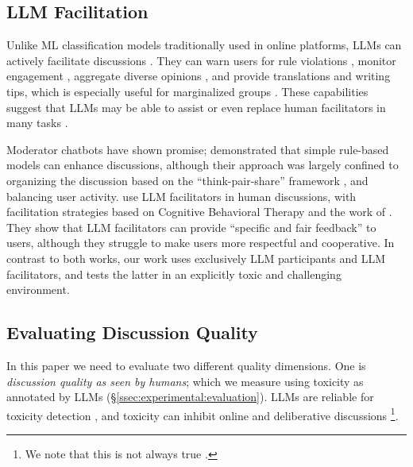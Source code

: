 \subsection{LLM Facilitation}

Unlike \ac{ML} classification models traditionally used in online platforms, \acp{LLM} can actively facilitate discussions \cite{korre2025evaluation}. They can warn users for rule violations \cite{Kumar_AbuHashem_Durumeric_2024}, monitor engagement \cite{schroeder-etal-2024-fora}, aggregate diverse opinions \cite{small-polis-llm}, and provide translations and writing tips, which is especially useful for marginalized groups \cite{Tsai2024Generative}. These capabilities suggest that \acp{LLM} may be able to assist or even replace human facilitators in many tasks \cite{small-polis-llm, seering_self_moderation}.

Moderator chatbots have shown promise; \citet{kim_et_al_chatbot} demonstrated that simple rule-based models can enhance discussions, although their approach was largely confined to organizing the discussion based on the ``think-pair-share'' framework \cite{ahmad_2010_supporting, Navajas2018}, and balancing user activity. \citet{cho-etal-2024-language} use \ac{LLM} facilitators in human discussions, with facilitation strategies based on Cognitive Behavioral Therapy and the work of \citet{rosenberg2015nonviolent}. They show that \ac{LLM} facilitators can provide “specific and fair feedback” to users, although they struggle to make users more respectful and cooperative.  In contrast to both works, our work uses exclusively \ac{LLM} participants and \ac{LLM} facilitators, and tests the latter in an explicitly toxic and challenging environment.


\subsection{Evaluating Discussion Quality}
\label{ssec:related:quality}

In this paper we need to evaluate two different quality dimensions. One is \emph{discussion quality as seen by humans}; which we measure using toxicity as annotated by \acp{LLM}  (\S\ref{ssec:experimental:evaluation}). \acp{LLM} are reliable for toxicity detection \citep{kang-qian-2024-implanting, Wang2022ToxicityDW, anjum2024hate}, and toxicity can inhibit online and deliberative discussions \citep{dekock2022disagree, XiaToxicity}\footnote{We note that this is not always true \citep{Avalle2024PersistentIP}.}. 

